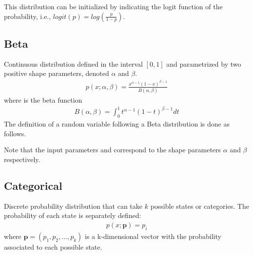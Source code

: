 \documentclass[letterpaper,10pt,english]{sphinxmanual}
\begin{document}
This distribution can be initialized by indicating the logit function of the probability, i.e., \(logit(p) = log(\frac{p}{1-p})\).


\subsection{Beta}
\label{\detokenize{notes/guidemodels:beta}}
Continuous distribution defined in the interval \([0,1]\) and parametrized by two positive shape parameters,
denoted \(\alpha\) and \(\beta\).
\begin{equation*}
\begin{split}p(x;\alpha,\beta)=\frac{x^{\alpha-1}(1-x)^{\beta-1}}{B(\alpha,\beta)}\end{split}
\end{equation*}
where  is the beta function
\begin{equation*}
\begin{split}B(\alpha,\beta)=\int_{0}^{1}t^{\alpha-1}(1-t)^{\beta-1}dt\end{split}
\end{equation*}
The definition of a random variable following a Beta distribution is done as follows.

\begin{sphinxVerbatim}[commandchars=\\\{\}]
   


  
\end{sphinxVerbatim}

Note that the input parameters  and  correspond to the shape
parameters \(\alpha\) and \(\beta\) respectively.


\subsection{Categorical}
\label{\detokenize{notes/guidemodels:categorical}}
Discrete probability distribution that can take \(k\) possible states or categories. The probability
of each state is separately defined:
\begin{equation*}
\begin{split}p(x;\mathbf{p}) = p_i\end{split}
\end{equation*}
where \(\mathbf{p} = (p_1, p_2, \ldots, p_k)\) is a k-dimensional vector with the probability associated to each possible state.
\end{document}
